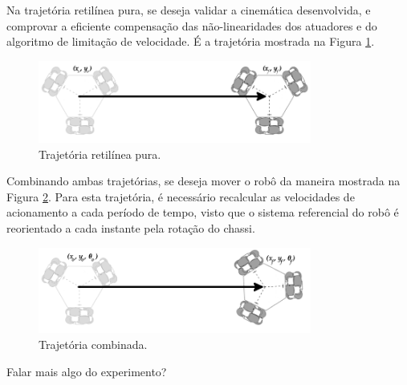 Na trajetória retilínea pura, se deseja validar a cinemática desenvolvida, e comprovar a eficiente compensação das não-linearidades dos atuadores e do algoritmo de limitação de velocidade. É a trajetória mostrada na Figura \ref{fig:reta}.

\begin{figure}[h]
  \centering
  \includegraphics[width = 0.8\textwidth]{imagens/reta}
  \caption{Trajetória retilínea pura.}
  \label{fig:reta}
\end{figure}

Combinando ambas trajetórias, se deseja mover o robô da maneira mostrada na Figura \ref{fig:hibrida}. Para esta trajetória, é necessário recalcular as velocidades de acionamento a cada período de tempo, visto que o sistema referencial do robô é reorientado a cada instante pela rotação do chassi.

\begin{figure}[h]
  \centering
  \includegraphics[width = 0.8\textwidth]{imagens/hibrida}
  \caption{Trajetória combinada.}
  \label{fig:hibrida}
\end{figure}

Falar mais algo do experimento?
